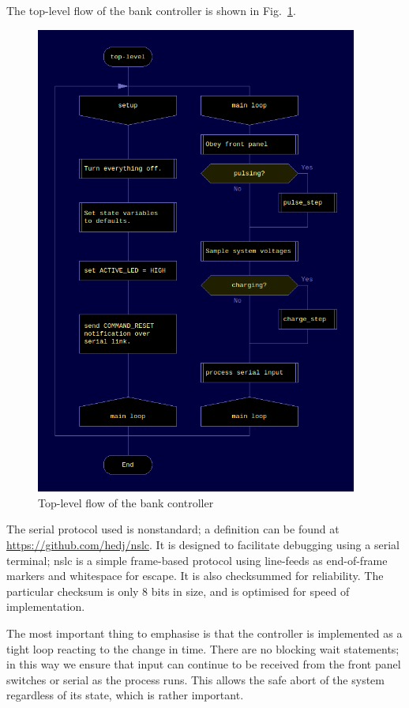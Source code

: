 The top-level flow of the bank controller is shown in Fig.~\ref{fig:toplevelbank}.

\begin{figure}
  \includegraphics[width=400px]{top_level.png}
\caption{\label{fig:toplevelbank} Top-level flow of the bank controller}
\end{figure}

The serial protocol used is nonstandard; a definition can be found at \url{https://github.com/hedj/nslc}.  It is designed to facilitate debugging using a serial terminal; nslc is a simple frame-based protocol using line-feeds as end-of-frame markers and whitespace for escape. It is also checksummed for reliability. The particular checksum is only 8 bits in size, and is optimised for speed of implementation.

The most important thing to emphasise is that the controller is implemented as a tight loop reacting to the change in time. There are no blocking wait statements; in this way we ensure that input can continue to be received from the front panel switches or serial as the process runs. This allows the safe abort of the system regardless of its state, which is rather important.

